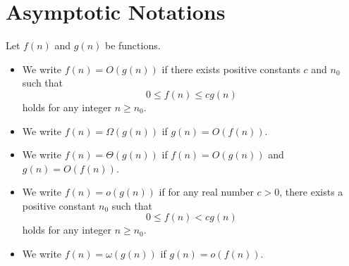 \section{Asymptotic Notations}
\begin{definition}
  Let $f(n)$ and $g(n)$ be functions.
  \begin{itemize}
    \item We write $f(n) = O(g(n))$ if there exists positive constants $c$ and
    $n_0$ such that
    \begin{equation*}
      0 \leq f(n) \leq cg(n)
    \end{equation*}
    holds for any integer $n \geq n_0$.
    \item We write $f(n) = \Omega(g(n))$ if $g(n) = O(f(n))$.
    \item We write $f(n) = \Theta(g(n))$ if $f(n) = O(g(n))$ and $g(n) =
    O(f(n))$.
    \item We write $f(n) = o(g(n))$ if for any real number $c > 0$, there
    exists a positive constant $n_0$ such that
    \begin{equation*}
      0 \leq f(n) < cg(n)
    \end{equation*}
    holds for any integer $n \geq n_0$.
    \item We write $f(n) = \omega(g(n))$ if $g(n) = o(f(n))$.
  \end{itemize}
\end{definition}